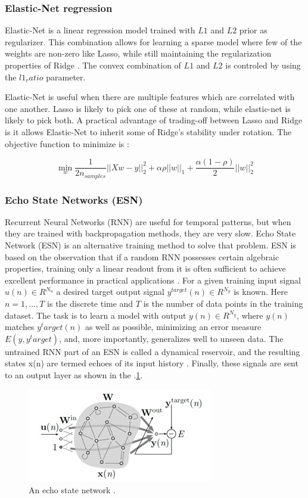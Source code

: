 \documentclass[review]{elsarticle}
\begin{document}
\subsubsection{Elastic-Net regression}
Elastic-Net is a linear regression model trained with $L1$ and $L2$ prior as regularizer. This combination allows for learning a sparse model where few of the weights are non-zero like Lasso, while still maintaining the regularization properties of Ridge  \citep{scikitlearn2011}. The convex combination of $L1$ and $L2$ is controled by using the $l1_ratio$ parameter.

Elastic-Net is useful when there are multiple features which are correlated with one another. Lasso is likely to pick one of these at random, while elastic-net is likely to pick both.
A practical advantage of trading-off between Lasso and Ridge is it allows Elastic-Net to inherit some of Ridge’s stability under rotation. The objective function to minimize is \citep{scikitlearn2011}:

$$\min_{w} { \frac{1}{2n_{samples}} \Bigr| \Bigr| Xw - y \Bigr| \Bigr|_2^2  + \alpha \rho \Bigr| \Bigr| w \Bigr| \Bigr|_1 + \frac{\alpha (1- \rho)}{2} \Bigr| \Bigr| w \Bigr| \Bigr|_2^2 } $$

\subsubsection{Echo State Networks (ESN)}
Recurrent Neural Networks (RNN) are useful for temporal patterns, but when they are trained with backpropagation methods, they are very slow.  Echo State Network (ESN) is an alternative training method to solve that problem.  ESN is based on the observation that if a random RNN possesses certain algebraic properties, training only a linear readout from it is often sufficient to achieve excellent performance in practical applications \citep{Lukose2009}. 
For a given training input signal $u(n)  \in R^{N_u}$ a desired target output signal $y^{target}(n) \in R^{N_y}$
is known. Here $n = 1, . . . ,T$ is the discrete time and $T$ is the number of data points in the training dataset. The task is to learn a model with output $y(n) \in R^{N_y}$, where $y(n)$ matches $y^target(n)$ as well as possible, minimizing an error measure $E(y,y^target)$, and, more importantly, generalizes well to unseen data. The untrained RNN part of an ESN is called a dynamical reservoir, and the resulting states x(n) are termed echoes of its input history \citep{Lukose2012}. Finally, these signals are sent to an output layer as shown in the \figurename
$.$\ref{figura3}.
\begin{figure}[h] 
 \centering
 \includegraphics[scale=.9]{Reservorio}
 \caption{An echo state network \citep{Lukose2012}.} 
 \label{figura3} 
\end{figure}
 
\end{document}
